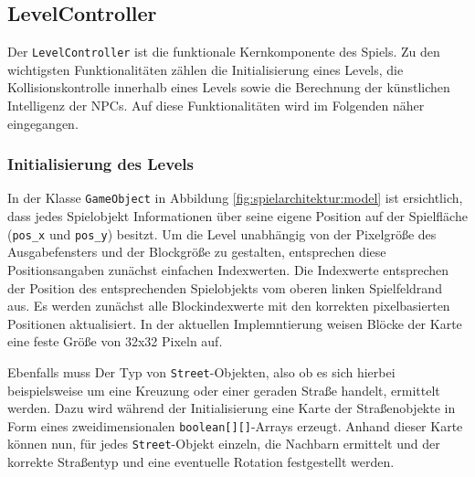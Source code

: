 \subsection{LevelController}
\label{sub:architektur:levelcontroller}

Der \texttt{LevelController} ist die funktionale Kernkomponente des Spiels.
Zu den wichtigsten Funktionalitäten zählen die Initialisierung eines Levels, die Kollisionskontrolle innerhalb eines Levels sowie die Berechnung der künstlichen Intelligenz der NPCs.
Auf diese Funktionalitäten wird im Folgenden näher eingegangen.

\subsubsection{Initialisierung des Levels}
In der Klasse \texttt{GameObject} in Abbildung \ref{fig:spielarchitektur:model} ist ersichtlich, dass jedes Spielobjekt Informationen über seine eigene Position auf der Spielfläche (\texttt{pos\_x} und \texttt{pos\_y}) besitzt.
Um die Level unabhängig von der Pixelgröße des Ausgabefensters und der Blockgröße zu gestalten, entsprechen diese Positionsangaben zunächst einfachen Indexwerten.
Die Indexwerte entsprechen der Position des entsprechenden Spielobjekts vom oberen linken Spielfeldrand aus.
Es werden zunächst alle Blockindexwerte mit den korrekten pixelbasierten Positionen aktualisiert.
In der aktuellen Implemntierung weisen Blöcke der Karte eine feste Größe von 32x32 Pixeln auf.

Ebenfalls muss Der Typ von \texttt{Street}-Objekten, also ob es sich hierbei beispielsweise um eine Kreuzung oder einer geraden Straße handelt, ermittelt werden.
Dazu wird während der Initialisierung eine Karte der Straßenobjekte in Form eines zweidimensionalen \texttt{boolean[][]}-Arrays erzeugt.
Anhand dieser Karte können nun, für jedes \texttt{Street}-Objekt einzeln, die Nachbarn ermittelt und der korrekte Straßentyp und eine eventuelle Rotation festgestellt werden.

